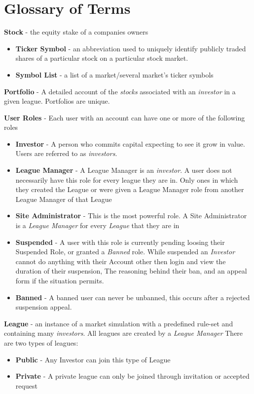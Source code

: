 \section{Glossary of Terms}

{
\raggedright
\textbf{Stock} - the equity stake of a companies owners
\begin{itemize}
\item \textbf{Ticker Symbol} - an abbreviation used to uniquely identify publicly traded shares of a particular stock on a particular stock market.
\item \textbf{Symbol List} - a list of a market/several market's ticker symbols
\end{itemize}

\textbf{Portfolio} - A detailed account of the \emph{stocks} associated with an \emph{investor} 
in a given league. Portfolios are unique. 

\textbf{User Roles} - Each user with an account can have one or more of the following roles
\begin{itemize}
\item \textbf{Investor} - A person who commits capital expecting to see it grow in value. Users are referred 
to as \emph{investors}.
\item \textbf{League Manager} - A League Manager is an \emph{investor}.  A user does not necessarily have this role for every league they are in.  Only ones in which they created the League or were given a League Manager role from another League Manager of that League 
\item \textbf{Site Administrator} - This is the most powerful role. A Site Administrator is a \emph{League Manager} for every \emph{League} that they are in
\item \textbf{Suspended} - A user with this role is currently pending loosing their Suspended Role, or granted a \emph{Banned} role.  While suspended an \emph{Investor} cannot do anything with their Account other then login and view the duration of their suspension, The reasoning behind their ban, and an appeal form if the situation permits.
\item \textbf{Banned} - A banned user can never be unbanned, this occurs after a rejected suspension appeal.
\end{itemize}

\textbf{League} - an instance of a market simulation with a predefined rule-set and containing many \emph{investors}. All leagues are created by a \emph{League Manager} There are two types of leagues:
\begin{itemize}
\item \textbf{Public} - Any Investor can join this type of League
\item \textbf{Private} - A private league can only be joined through invitation or accepted request
\end{itemize}

}
